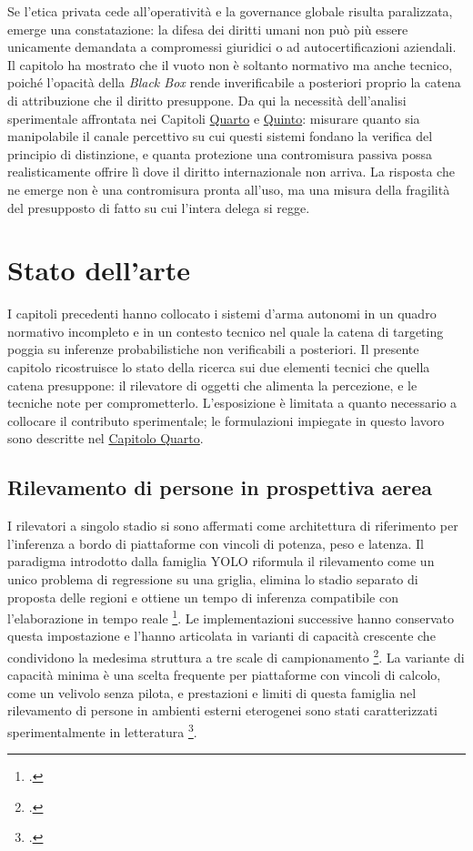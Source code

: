\ifstampa\documentclass[a4paper,12pt,twoside,openright]{report}\else\documentclass[a4paper,12pt]{report}\fi
\newif\ifrevisione \revisionefalse
\DeclareRobustCommand{\rev}[1]{\ifrevisione{\color{blue!65!black}#1}\else#1\fi}
\begin{document}
Se l'etica privata cede all'operatività e la governance globale risulta
paralizzata, emerge una constatazione: la difesa dei diritti umani non può più
essere unicamente demandata a compromessi giuridici o ad autocertificazioni
aziendali. Il capitolo ha mostrato che il vuoto non è soltanto normativo ma anche
tecnico, poiché l'opacità della \textit{Black Box} rende inverificabile a
posteriori proprio la catena di attribuzione che il diritto presuppone. Da qui la
necessità dell'analisi sperimentale affrontata nei Capitoli \hyperref[cap4]{Quarto} e \hyperref[cap5]{Quinto}: misurare quanto sia manipolabile il canale percettivo su cui questi sistemi fondano la
verifica del principio di distinzione, e quanta protezione una contromisura
passiva possa realisticamente offrire lì dove il diritto internazionale non
arriva. La risposta che ne emerge non è una contromisura pronta all'uso, ma una
misura della fragilità del presupposto di fatto su cui l'intera delega si regge.

\chapter{Stato dell'arte}
\label{cap3}

I capitoli precedenti hanno collocato i sistemi d'arma autonomi in un quadro
normativo incompleto e in un contesto tecnico nel quale la catena di targeting
poggia su inferenze probabilistiche non verificabili a posteriori. Il presente
capitolo ricostruisce lo stato della ricerca sui due elementi tecnici che quella
catena presuppone: il rilevatore di oggetti che alimenta la percezione, e le
tecniche note per comprometterlo. L'esposizione è limitata a quanto necessario a
collocare il contributo sperimentale; le formulazioni impiegate in questo lavoro
sono descritte nel \hyperref[cap4]{Capitolo Quarto}.

\section{Rilevamento di persone in prospettiva aerea}
\label{sec:sota_detection}

I rilevatori a singolo stadio si sono affermati come architettura di riferimento
per l'inferenza a bordo di piattaforme con vincoli di potenza, peso e latenza. Il
paradigma introdotto dalla famiglia YOLO riformula il rilevamento come un unico
problema di regressione su una griglia, elimina lo stadio separato di proposta
delle regioni e ottiene un tempo di inferenza compatibile con l'elaborazione in
tempo reale \footcite{redmon_2016_yolo}. Le implementazioni successive hanno
conservato questa impostazione e l'hanno articolata in varianti di capacità
crescente che condividono la medesima struttura a tre scale di campionamento
\footcite{jocher_2023_yolov8}. La variante di capacità minima è \rev{una scelta frequente per piattaforme con
vincoli di calcolo, come un velivolo senza pilota},
e prestazioni e limiti di questa famiglia nel rilevamento di persone in ambienti
esterni eterogenei sono stati caratterizzati sperimentalmente in letteratura
\footcite{sodhro_2025}.
\end{document}
